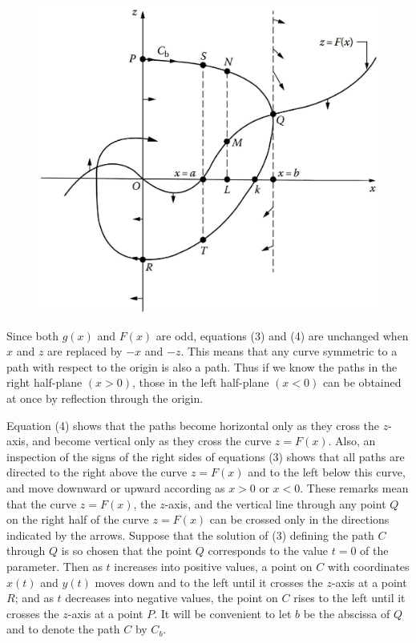 \documentclass[12pt,a4paper]{article}
\begin{document}
\begin{figure}
\centering
\includegraphics[height=8.cm, angle=0]{Proof_Lienard_ThTheorem.eps}
\caption{
}
\label{fig:Proof_Lienard_ThTheorem}
\end{figure}

Since both $g(x)$ and $F(x)$ are odd, equations (3) and (4) are unchanged when $x$ and $z$ are replaced by $-x$ and $-z$. This means that any curve symmetric to a path with respect to the origin is also a path. Thus if we know the
paths in the right half-plane $(x > 0)$, those in the left half-plane $(x < 0)$ can be obtained at once by reflection through the origin. 

Equation (4) shows that the paths become horizontal only as they cross the $z$-axis, and become vertical only as they cross the curve $z = F(x)$. Also, an inspection of the signs of the right sides of equations (3) shows
that all paths are directed to the right above the curve $z = F(x)$ and to the left below this curve, and move downward or upward according as $x > 0$ or $x < 0$. These remarks mean that the curve $z = F(x)$, the $z$-axis, and the vertical line through any point $Q$ on the right half of the curve $z = F(x)$ can be crossed only in the directions indicated by the arrows. Suppose that the solution of (3) defining the path $C$ through $Q$ is so chosen that the point $Q$ corresponds to the value $t = 0$ of the parameter. Then as $t$ increases into positive values, a point on $C$ with coordinates $x(t)$ and $y(t)$ moves down and to the left until it crosses the $z$-axis at a point $R$; and as $t$ decreases into negative values, the point on $C$ rises to the left until it crosses the $z$-axis at a point $P$. It will be convenient to let $b$ be the abscissa of $Q$ and to denote the path $C$ by $C_b$.
\end{document}
